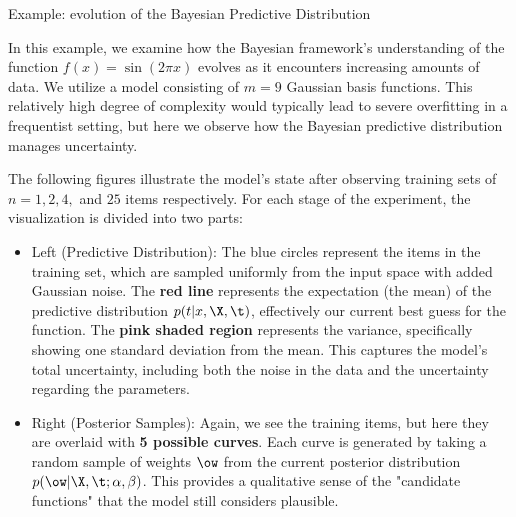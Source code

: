 \begin{myexample}
Example: evolution of the Bayesian Predictive Distribution

\medskip
In this example, we examine how the Bayesian framework's understanding of the function $f(x) = \sin(2\pi x)$ evolves as it encounters increasing amounts of data. We utilize a model consisting of $m=9$ Gaussian basis functions. This relatively high degree of complexity would typically lead to severe overfitting in a frequentist setting, but here we observe how the Bayesian predictive distribution manages uncertainty.


The following figures illustrate the model's state after observing training sets of $n=1, 2, 4,$ and $25$ items respectively. For each stage of the experiment, the visualization is divided into two parts:

\begin{itemize}
    \item Left (Predictive Distribution): The blue circles represent the items in the training set, which are sampled uniformly from the input space with added Gaussian noise. The \textbf{red line} represents the expectation (the mean) of the predictive distribution $p(t|x, \X, \t)$, effectively our current best guess for the function. The \textbf{pink shaded region} represents the variance, specifically showing one standard deviation from the mean. This captures the model's total uncertainty, including both the noise in the data and the uncertainty regarding the parameters.
    
    \item Right (Posterior Samples): Again, we see the training items, but here they are overlaid with \textbf{5 possible curves}. Each curve is generated by taking a random sample of weights $\ow$ from the current posterior distribution $p(\ow|\X, \t; \alpha, \beta)$. This provides a qualitative sense of the "candidate functions" that the model still considers plausible.
\end{itemize}



\end{myexample}
